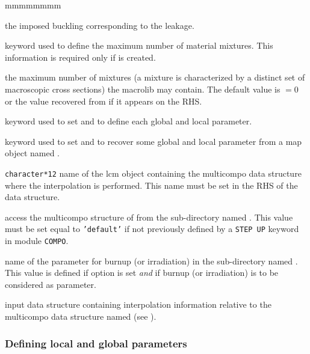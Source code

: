\begin{ListeDeDescription}{mmmmmmmm}
\item[\dusa{b2}] the imposed buckling corresponding to the leakage.

\item[\moc{NMIX}] keyword used to define the maximum number of material mixtures. This information is required  only if  is created.

\item[\dusa{nmixt}] the maximum number of mixtures (a mixture is characterized by a distinct set of 
macroscopic cross sections) the {\sc macrolib} may contain. The default value is  $=0$ or the value recovered from  if it appears on the RHS.

\item[\moc{COMPO}] keyword used to set  and to define each global and local parameter.

\item[\moc{TABLE}] keyword used to set  and to recover some global and local parameter from a {\sc map} object named .

\item[\dusa{CPONAM}] {\tt character*12} name of the {\sc lcm} object containing the
{\sc multicompo} data structure where the interpolation is performed. This name must be set in the RHS of the   data structure.

\item[\dusa{NAMDIR}] access the {\sc multicompo} structure of  from the sub-directory named .
This value must be set equal to {\tt 'default'} if not previously defined by a {\tt STEP UP} keyword in module {\tt COMPO}.

\item[\dusa{namburn}] name of the parameter for burnup (or irradiation) in the sub-directory named .
This value is defined if option  is set {\sl and} if burnup (or irradiation) is to be considered as parameter.

\item[\dusa{descintf}] input data structure containing interpolation information relative to the {\sc multicompo} data structure named  (see ).

\end{ListeDeDescription}

\subsubsection{Defining local and global parameters}\label{sect:descintf}

